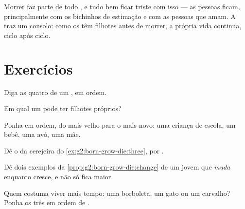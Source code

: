 \begin{remark}\label{rem:g2:born-grow-die:death}
Morrer faz parte de todo , e tudo bem ficar triste com
isso --- as pessoas ficam, principalmente com os bichinhos de
estimação e com as pessoas que amam. A  traz um consolo:
como os  têm filhotes antes de morrer, a própria vida
continua, ciclo após ciclo.
\end{remark}

\section{Exercícios}

\begin{exercise}[$\star$]\label{exo:g2:born-grow-die:1}
Diga as quatro  de um , em ordem.
\end{exercise}

\begin{exercise}[$\star$]\label{exo:g2:born-grow-die:2}
Em qual  um  pode ter filhotes próprios?
\end{exercise}

\begin{exercise}[$\star$]\label{exo:g2:born-grow-die:3}
Ponha em ordem, do mais velho para o mais novo: uma criança de
escola, um bebê, uma avó, uma mãe.
\end{exercise}

\begin{exercise}[$\star$]\label{exo:g2:born-grow-die:4}
Dê o  da cerejeira do \cref{ex:g2:born-grow-die:three},
 por .
\end{exercise}

\begin{exercise}[$\star$]\label{exo:g2:born-grow-die:5}
Dê dois exemplos da \cref{prop:g2:born-grow-die:change} de um  jovem que \emph{muda} enquanto cresce, e não só fica maior.
\end{exercise}

\begin{exercise}[$\star$]\label{exo:g2:born-grow-die:6}
Quem costuma viver mais tempo: uma borboleta, um gato ou um
carvalho? Ponha os três em ordem de .
\end{exercise}

